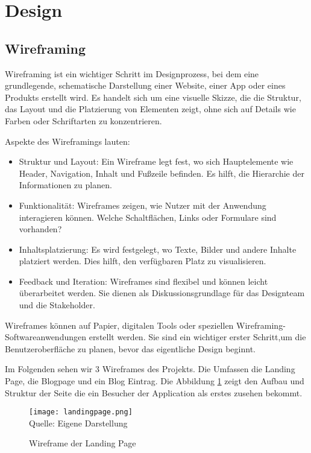 \newpage

\section{ Design } 
\subsection{ Wireframing}

Wireframing ist ein wichtiger Schritt im Designprozess, bei dem eine grundlegende, schematische Darstellung 
einer Website, einer App oder eines Produkts erstellt wird. Es handelt sich um eine visuelle Skizze, die die 
Struktur, das Layout und die Platzierung von Elementen zeigt, ohne sich auf Details wie Farben oder Schriftarten 
zu konzentrieren.

Aspekte des Wireframings lauten:

\begin{itemize}
    \item Struktur und Layout: Ein Wireframe legt fest, wo sich Hauptelemente wie Header, Navigation, Inhalt und Fußzeile befinden. Es hilft, die Hierarchie der Informationen zu planen.
    \item Funktionalität: Wireframes zeigen, wie Nutzer mit der Anwendung interagieren können. Welche Schaltflächen, Links oder Formulare sind vorhanden?
    \item Inhaltsplatzierung: Es wird festgelegt, wo Texte, Bilder und andere Inhalte platziert werden. Dies hilft, den verfügbaren Platz zu visualisieren.
    \item Feedback und Iteration: Wireframes sind flexibel und können leicht überarbeitet werden. Sie dienen als Diskussionsgrundlage für das Designteam und die Stakeholder.
\end{itemize}

Wireframes können auf Papier, digitalen Tools oder speziellen Wireframing-Softwareanwendungen erstellt werden. Sie sind ein wichtiger erster Schritt,um die 
Benutzeroberfläche zu planen, bevor das eigentliche Design beginnt.

Im Folgenden sehen wir 3 Wireframes des Projekts. Die Umfassen die Landing Page, die Blogpage und ein Blog Eintrag. Die Abbildung \ref*{fig:Landing_Page}
zeigt den Aufbau und Struktur der Seite die ein Besucher der Application als erstes zusehen bekommt.
\begin{figure}[H]
    \caption{Wireframe der Landing Page}\label{fig:Landing_Page}
    \texttt{[image: landingpage.png]}
    \\
    Quelle: Eigene Darstellung
\end{figure}

